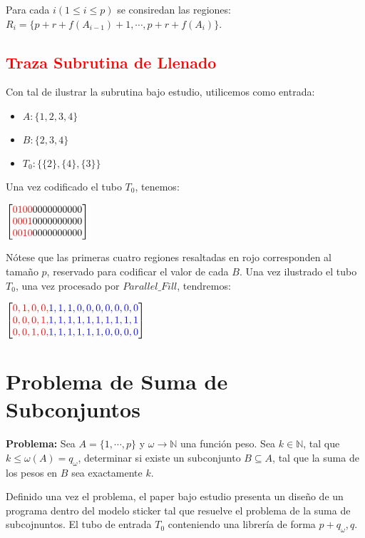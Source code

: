 \documentclass[12pt, letterpaper, twoside]{article}
\begin{document}
    Para cada $i (1\leq i \leq p)$ se consiredan las regiones: $R_i=\{p+r+f(A_{i-1})+1,\cdots,p+r+f(A_i)\}$.


   \subsection{\textcolor{red}{Traza Subrutina de Llenado}}
   Con tal de ilustrar la subrutina bajo estudio, utilicemos como entrada:
   \begin{itemize}
       \item $A: \{1, 2, 3, 4\}$
       \item $B: \{2, 3, 4\}$
       \item $T_0: \{\{2\}, \{4\}, \{3\}\}$
    \end{itemize}
    Una vez codificado el tubo $T_0$, tenemos:


$
    \begin{bmatrix}
    \textcolor{red}{0 1 0 0} 0 0 0 0 0 0 0 0 0 0 \\
    \textcolor{red}{0 0 0 1} 0 0 0 0 0 0 0 0 0 0 \\
    \textcolor{red}{0 0 1 0} 0 0 0 0 0 0 0 0 0 0
    \end{bmatrix}
$


Nótese que las primeras cuatro regiones resaltadas en rojo corresponden al tamaño $p$, reservado para codificar el valor de cada $B$. Una vez ilustrado el tubo $T_0$, una vez procesado por $Parallel\_Fill$, tendremos:


$
    \begin{bmatrix}
        \textcolor{red}{0, 1, 0, 0,} \textcolor{blue}{1, 1, 1, 0, 0, 0, 0, 0, 0, 0} \\
        \textcolor{red}{0, 0, 0, 1,} \textcolor{blue}{1, 1, 1, 1, 1, 1, 1, 1, 1, 1} \\
        \textcolor{red}{0, 0, 1, 0,} \textcolor{blue}{1, 1, 1, 1, 1, 1, 0, 0, 0, 0}
    \end{bmatrix}
$


    \section{Problema de Suma de Subconjuntos}
    \textbf{Problema:} Sea $A=\{1,\cdots,p\}$ y $\omega\rightarrow\mathbb{N}$ una función peso. Sea $k\in\mathbb{N}$, tal que $k\leq\omega(A)=q_\omega$, determinar si existe un subconjunto $B\subseteq A$, tal que la suma de los pesos en $B$ sea exactamente $k$.


    Definido una vez el problema, el paper bajo estudio presenta un diseño de un programa dentro del modelo sticker tal que resuelve el problema de la suma de subcojnuntos. El tubo de entrada $T_0$ conteniendo una librería de forma $p+q_\omega, q$. 
\end{document}
